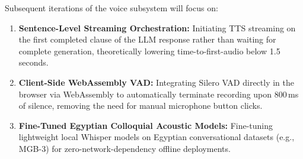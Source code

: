 Subsequent iterations of the voice subsystem will focus on:
\begin{enumerate}
    \item \textbf{Sentence-Level Streaming Orchestration:} Initiating TTS streaming on the first completed clause of the LLM response rather than waiting for complete generation, theoretically lowering time-to-first-audio below 1.5 seconds.
    \item \textbf{Client-Side WebAssembly VAD:} Integrating Silero VAD directly in the browser via WebAssembly to automatically terminate recording upon 800\,ms of silence, removing the need for manual microphone button clicks.
    \item \textbf{Fine-Tuned Egyptian Colloquial Acoustic Models:} Fine-tuning lightweight local Whisper models on Egyptian conversational datasets (e.g., MGB-3) for zero-network-dependency offline deployments.
\end{enumerate}
